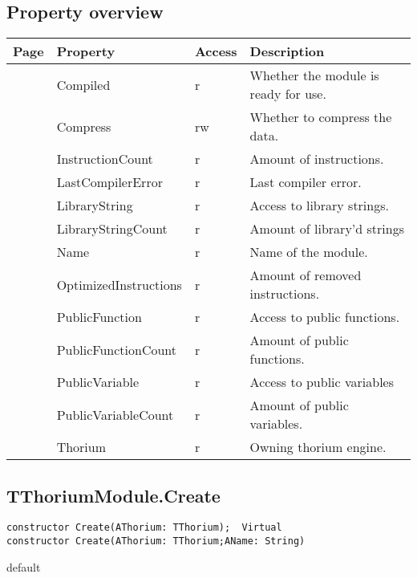 \subsection{Property overview}
\label{thoriumcorepkg:thorium:tthoriummodule:properties}
\begin{tabularx}{\textwidth}{lllX}
Page & Property & Access & Description \\ \hline
\pageref{thoriumcorepkg:thorium:tthoriummodule:compiled} & Compiled & r & Whether the module is ready for use. \\
\pageref{thoriumcorepkg:thorium:tthoriummodule:compress} & Compress & rw & Whether to compress the data. \\
\pageref{thoriumcorepkg:thorium:tthoriummodule:instructioncount} & InstructionCount & r & Amount of instructions. \\
\pageref{thoriumcorepkg:thorium:tthoriummodule:lastcompilererror} & LastCompilerError & r & Last compiler error. \\
\pageref{thoriumcorepkg:thorium:tthoriummodule:librarystring} & LibraryString & r & Access to library strings. \\
\pageref{thoriumcorepkg:thorium:tthoriummodule:librarystringcount} & LibraryStringCount & r & Amount of library'd strings \\
\pageref{thoriumcorepkg:thorium:tthoriummodule:name} & Name & r & Name of the module. \\
\pageref{thoriumcorepkg:thorium:tthoriummodule:optimizedinstructions} & OptimizedInstructions & r & Amount of removed instructions. \\
\pageref{thoriumcorepkg:thorium:tthoriummodule:publicfunction} & PublicFunction & r & Access to public functions. \\
\pageref{thoriumcorepkg:thorium:tthoriummodule:publicfunctioncount} & PublicFunctionCount & r & Amount of public functions. \\
\pageref{thoriumcorepkg:thorium:tthoriummodule:publicvariable} & PublicVariable & r & Access to public variables \\
\pageref{thoriumcorepkg:thorium:tthoriummodule:publicvariablecount} & PublicVariableCount & r & Amount of public variables. \\
\pageref{thoriumcorepkg:thorium:tthoriummodule:thorium} & Thorium & r & Owning thorium engine. \\
\hline
\end{tabularx}
\subsection{TThoriumModule.Create}
\label{thoriumcorepkg:thorium:tthoriummodule:create}
\begin{FPCList}
\Declaration 

\begin{verbatim}
constructor Create(AThorium: TThorium);  Virtual
constructor Create(AThorium: TThorium;AName: String)
\end{verbatim}
\Visibility
default
\end{FPCList}
